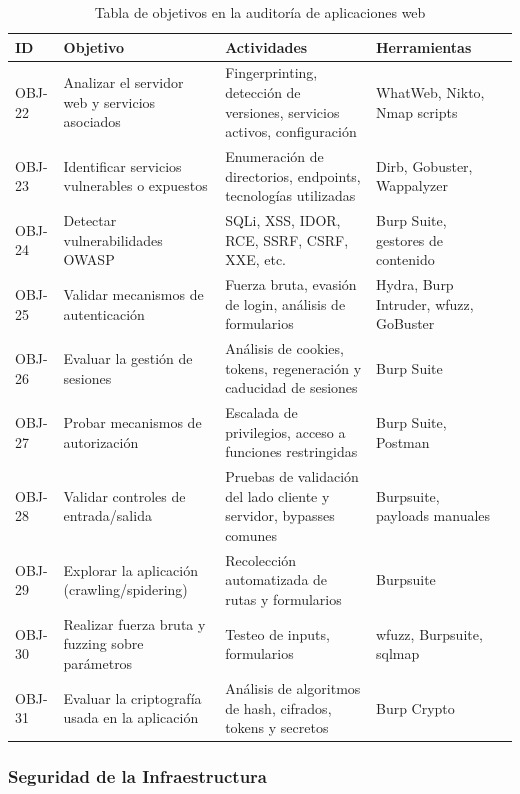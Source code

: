 \documentclass[a4paper, 11pt]{article}
\begin{document}
\begin{table}[H]
\centering
\renewcommand{\arraystretch}{1.4}
\begin{tabular}{|p{1.4cm}|p{4cm}|p{4.8cm}|p{3.8cm}|p{2.5cm}|}
\hline
\textbf{ID} & \textbf{Objetivo} & \textbf{Actividades} & \textbf{Herramientas}  \\
\hline
OBJ-22 & Analizar el servidor web y servicios asociados & Fingerprinting, detección de versiones, servicios activos, configuración & WhatWeb, Nikto, Nmap scripts  \\
\hline
OBJ-23 & Identificar servicios vulnerables o expuestos & Enumeración de directorios, endpoints, tecnologías utilizadas & Dirb, Gobuster, Wappalyzer  \\
\hline
OBJ-24 & Detectar vulnerabilidades OWASP & SQLi, XSS, IDOR, RCE, SSRF, CSRF, XXE, etc. & Burp Suite, gestores de contenido \\
\hline
OBJ-25 & Validar mecanismos de autenticación & Fuerza bruta, evasión de login, análisis de formularios & Hydra, Burp Intruder, wfuzz, GoBuster  \\
\hline
OBJ-26 & Evaluar la gestión de sesiones & Análisis de cookies, tokens, regeneración y caducidad de sesiones &  Burp Suite  \\
\hline
OBJ-27 & Probar mecanismos de autorización & Escalada de privilegios, acceso a funciones restringidas & Burp Suite, Postman \\
\hline
OBJ-28 & Validar controles de entrada/salida & Pruebas de validación del lado cliente y servidor, bypasses comunes & Burpsuite, payloads manuales  \\
\hline
OBJ-29 & Explorar la aplicación (crawling/spidering) & Recolección automatizada de rutas y formularios & Burpsuite \\
\hline
OBJ-30 & Realizar fuerza bruta y fuzzing sobre parámetros & Testeo de inputs, formularios & wfuzz, Burpsuite, sqlmap  \\
\hline
OBJ-31 & Evaluar la criptografía usada en la aplicación & Análisis de algoritmos de hash, cifrados, tokens y secretos & Burp Crypto  \\
\hline
\end{tabular}
\caption{Tabla de objetivos en la auditoría de aplicaciones web}
\end{table}

\par\vspace{0.5cm}




\subsubsection{Seguridad de la Infraestructura}
\end{document}

